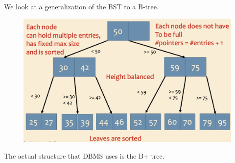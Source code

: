 \documentclass{article}
\begin{document}
    \begin{definition}[B Tree]
      We look at a generalization of the BST to a B-tree. 

      \begin{figure}[H]
        \centering 
        \includegraphics[scale=0.4]{img/b_tree.png}
        \caption{} 
        \label{fig:b_tree}
      \end{figure}
    \end{definition}

    The actual structure that DBMS uses is the B+ tree. 
\end{document}
